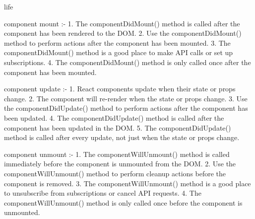 
life

component mount :- 
1. The componentDidMount() method is called after the component has been rendered to the DOM.
2. Use the componentDidMount() method to perform actions after the component has been mounted.
3. The componentDidMount() method is a good place to make API calls or set up subscriptions.
4. The componentDidMount() method is only called once after the component has been mounted.

component update :- 
1. React components update when their state or props change.
2. The component will re-render when the state or props change.
3. Use the componentDidUpdate() method to perform actions after the component has been updated.
4. The componentDidUpdate() method is called after the component has been updated in the DOM.
5. The componentDidUpdate() method is called after every update, not just when the state or props change.

component unmount :- 
1. The componentWillUnmount() method is called immediately before the component is unmounted from the DOM.
2. Use the componentWillUnmount() method to perform cleanup actions before the component is removed.
3. The componentWillUnmount() method is a good place to unsubscribe from subscriptions or cancel API requests.
4. The componentWillUnmount() method is only called once before the component is unmounted.

    